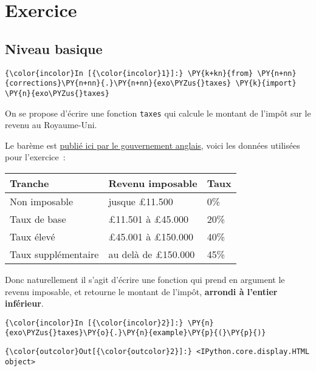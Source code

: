     
    
    
    

    

    \hypertarget{exercice}{%
\section{Exercice}\label{exercice}}

    \hypertarget{niveau-basique}{%
\subsection{Niveau basique}\label{niveau-basique}}

    \begin{Verbatim}[commandchars=\\\{\},frame=single,framerule=0.3mm,rulecolor=\color{cellframecolor}]
{\color{incolor}In [{\color{incolor}1}]:} \PY{k+kn}{from} \PY{n+nn}{corrections}\PY{n+nn}{.}\PY{n+nn}{exo\PYZus{}taxes} \PY{k}{import} \PY{n}{exo\PYZus{}taxes}
\end{Verbatim}


    On se propose d'écrire une fonction \texttt{taxes} qui calcule le
montant de l'impôt sur le revenu au Royaume-Uni.

    Le barème est \href{https://www.gov.uk/income-tax-rates}{publié ici par
le gouvernement anglais}, voici les données utilisées pour l'exercice~:

    \begin{longtable}[]{@{}lll@{}}
\toprule
Tranche & Revenu imposable & Taux\tabularnewline
\midrule
\endhead
Non imposable & jusque £11.500 & 0\%\tabularnewline
Taux de base & £11.501 à £45.000 & 20\%\tabularnewline
Taux élevé & £45.001 à £150.000 & 40\%\tabularnewline
Taux supplémentaire & au delà de £150.000 & 45\%\tabularnewline
\bottomrule
\end{longtable}

    Donc naturellement il s'agit d'écrire une fonction qui prend en argument
le revenu imposable, et retourne le montant de l'impôt, \textbf{arrondi
à l'entier inférieur}.

    \begin{Verbatim}[commandchars=\\\{\},frame=single,framerule=0.3mm,rulecolor=\color{cellframecolor}]
{\color{incolor}In [{\color{incolor}2}]:} \PY{n}{exo\PYZus{}taxes}\PY{o}{.}\PY{n}{example}\PY{p}{(}\PY{p}{)}
\end{Verbatim}


\begin{Verbatim}[commandchars=\\\{\},frame=single,framerule=0.3mm,rulecolor=\color{cellframecolor}]
{\color{outcolor}Out[{\color{outcolor}2}]:} <IPython.core.display.HTML object>
\end{Verbatim}
            
